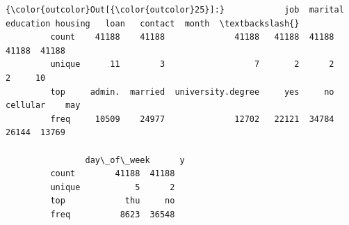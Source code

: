 \documentclass[8pt,onecolumn,aps,pra]{revtex4-1}
\begin{document}
\begin{Verbatim}[commandchars=\\\{\}]
{\color{outcolor}Out[{\color{outcolor}25}]:}            job  marital          education housing   loan   contact  month  \textbackslash{}
         count    41188    41188              41188   41188  41188     41188  41188   
         unique      11        3                  7       2      2         2     10   
         top     admin.  married  university.degree     yes     no  cellular    may   
         freq     10509    24977              12702   22121  34784     26144  13769   
         
                day\_of\_week      y  
         count        41188  41188  
         unique           5      2  
         top            thu     no  
         freq          8623  36548  
\end{Verbatim}
\end{document}

